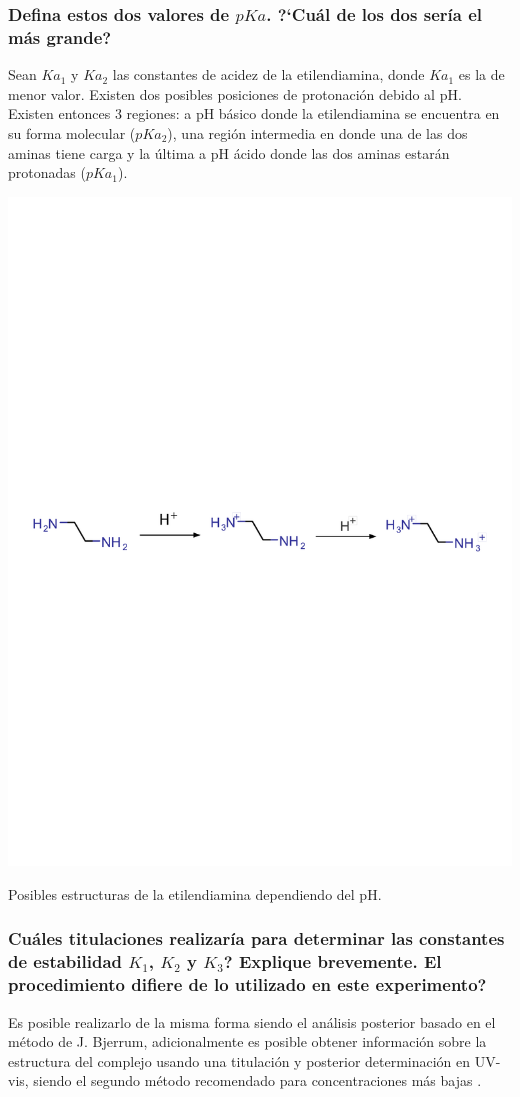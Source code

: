 \documentclass[fleqn,10pt]{SelfArx} %
\begin{document}
	\subsubsection{Defina estos dos valores de $pKa$. ?`Cu\'al de los dos ser\'ia el m\'as grande?}
	Sean $Ka_1$ y $Ka_2$ las constantes de acidez de la etilendiamina, donde $Ka_1$ es la de menor valor. Existen dos posibles posiciones de protonaci\'on debido al pH. Existen entonces 3 regiones: a pH b\'asico donde la etilendiamina se encuentra en su forma molecular ($pKa_2$), una regi\'on intermedia en donde una de las dos aminas tiene carga y la \'ultima a pH \'acido donde las dos aminas estar\'an protonadas ($pKa_1$).
	\begin{scheme}[h]
		\centering
		\includegraphics[width=\linewidth]{images/en_pKa.pdf}
		\caption{Posibles estructuras de la etilendiamina dependiendo del pH.}
		\label{sch:etilen_pka}
	\end{scheme}
	
	\subsubsection{Cu\'ales titulaciones realizar\'ia para determinar las constantes de estabilidad $K_1$, $K_2$ y $K_3$? Explique brevemente. El procedimiento difiere de lo utilizado en este experimento?}
	Es posible realizarlo de la misma forma siendo el an\'alisis posterior basado en el m\'etodo de J. Bjerrum, adicionalmente es posible obtener informaci\'on sobre la estructura del complejo usando una titulaci\'on y posterior determinaci\'on en UV-vis, siendo el segundo m\'etodo recomendado para concentraciones m\'as bajas \cite{pka determination}.
	
\end{document}
